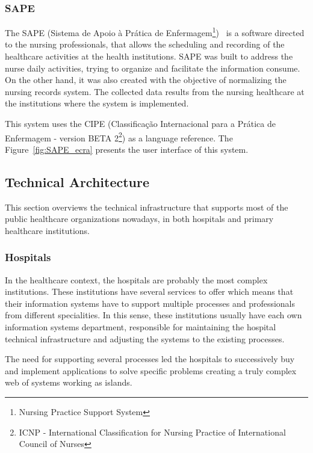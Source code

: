 \subsubsection{SAPE}
The SAPE (Sistema de Apoio à Prática de Enfermagem\footnote{Nursing Practice Support System})~\citep{ACSS_SAPE2010} is a software directed to the nursing professionals, that allows the scheduling and recording of the healthcare activities at the health institutions. SAPE was built to address the nurse daily activities, trying to organize and facilitate the information consume. On the other hand, it was also created with the objective of normalizing the nursing records system. The collected data results from the nursing healthcare at the institutions where the system is implemented.

This system uses the CIPE (Classificação Internacional para a Prática de Enfermagem - version BETA 2\footnote{ICNP - International Classification for Nursing Practice of International Council of Nurses}) as a language reference. The Figure~\ref{fig:SAPE_ecra} presents the user interface of this system.



\subsection{Technical Architecture}

This section overviews the technical infrastructure that supports most of the public healthcare organizations nowadays, in both hospitals and primary healthcare institutions.

\subsubsection{Hospitals}

In the healthcare context, the hospitals are probably the most complex institutions. These institutions have several services to offer which means that their information systems have to support multiple processes and professionals from different specialities. In this sense, these institutions usually have each own information systems department, responsible for maintaining the hospital technical infrastructure and adjusting the systems to the existing processes.

The need for supporting several processes led the hospitals to successively buy and implement applications to solve specific problems creating a truly complex web of systems working as islands. 

